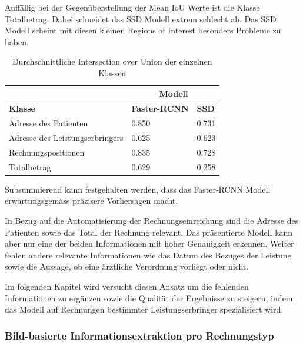 Auffällig bei der Gegenüberstellung der Mean IoU Werte ist die Klasse Totalbetrag. Dabei schneidet das SSD Modell extrem schlecht ab. Das SSD Modell scheint mit diesen kleinen Regions of Interest besonders Probleme zu haben.

\begin{table}[h!]
    \centering
    \captionsetup{width=.9\linewidth}
    \caption{Durchschnittliche Intersection over Union der einzelnen Klassen}
    \label{tab:3ap-iou}
    \begin{tabular}{|l|l|l|}
    \hhline{~|--|}    
    \multicolumn{1}{c|}{}
                                    & \multicolumn{2}{c|}{\cellcolor[HTML]{C0E5FD}\textbf{Modell}}  \\
    \hline
    \rowcolor[HTML]{C0E5FD}
    \textbf{Klasse}                 & \textbf{Faster-RCNN} & \textbf{SSD}           \\
    \hline
    Adresse des Patienten           & 0.850       & 0.731         \\
    \hline
    Adresse des Leistungserbringers & 0.625       & 0.623         \\
    \hline
    Rechnungspositionen             & 0.835       & 0.728         \\
    \hline
    Totalbetrag                     & 0.629       & 0.258         \\  
    \hline
    \end{tabular}
\end{table}

Subsummierend kann festgehalten werden, dass das Faster-RCNN Modell erwartungsgemäss präzisere Vorhersagen macht. 

In Bezug auf die Automatisierung der Rechnungseinreichung sind die Adresse des Patienten sowie das Total der Rechnung relevant. Das präsentierte Modell kann aber nur eine der beiden Informationen mit hoher Genauigkeit erkennen. Weiter fehlen andere relevante Informationen wie das Datum des Bezuges der Leistung sowie die Aussage, ob eine ärztliche Verordnung vorliegt oder nicht. 

Im folgenden Kapitel wird versucht diesen Ansatz um die fehlenden Informationen zu ergänzen sowie die Qualität der Ergebnisse zu steigern, indem das Modell auf Rechnungen bestimmter Leistungserbringer spezialisiert wird.

\subsubsection{Bild-basierte Informationsextraktion pro Rechnungstyp}
\label{chap:lerb-specific-ie}

